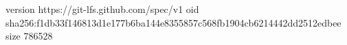 version https://git-lfs.github.com/spec/v1
oid sha256:f1db33f146813d1e177b6ba144e8355857c568fb1904cb6214442dd2512edbee
size 786528
